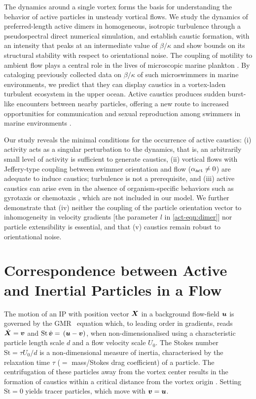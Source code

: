 \documentclass[../Rajarshi-thesis-draft.tex]{subfiles}
\begin{document}
The dynamics around a single vortex forms the basis for understanding the behavior of active particles in unsteady vortical flows. We study the dynamics of preferred-length active dimers in homogeneous, isotropic turbulence through a pseudospectral direct numerical simulation, and establish caustic formation, with an intensity that peaks at an intermediate value of $\beta/\kappa$ and show bounds on its structural stability with respect to orientational noise. The coupling of motility to ambient flow plays a central role in the lives of microscopic marine plankton \cite{Tuval2020, Krishnamurthy2020, mousavi2023efficient}. By cataloging previously collected data on $\beta/\kappa$ of such microswimmers in marine environments, we predict that they can display caustics in a vortex-laden turbulent ecosystem in the upper ocean. Active caustics produces sudden burst-like encounters between nearby particles, offering a new route to increased opportunities for communication and sexual reproduction \cite{BUSKEY199813} among swimmers in marine environments \cite{Tuval2020, StockerARFM2012}. 

Our study reveals the minimal conditions for the occurrence of active caustics: (i) activity acts as a singular perturbation to the dynamics, that is, an arbitrarily small level of activity is sufficient to generate caustics, (ii) vortical flows with Jeffery-type coupling between swimmer orientation and flow ($\alpha_{\rm act} \neq 0$) are adequate to induce caustics; turbulence is not a prerequisite, and (iii) active caustics can arise even in the absence of organism-specific behaviors such as gyrotaxis or chemotaxis \cite{Pedley1992}, which are not included in our model. We further demonstrate that (iv) neither the coupling of the particle orientation vector to inhomogeneity in velocity gradients [the parameter $l$ in \eqref{act-eqn:dimer}] nor particle extensibility is essential, and that (v) caustics remain robust to orientational noise.

\section{Correspondence between Active and Inertial Particles in a Flow}
The motion of an IP with position vector $\boldsymbol{X}$ in a background flow-field $\boldsymbol{u}$ is governed by the GMR~\cite{gatignol1983,MR1983} equation which, to leading order in gradients, reads $\dot{\boldsymbol{X}} = \boldsymbol{v}$ and $\text{St} \, \dot{\boldsymbol{v}}=  \, (\boldsymbol{u}-\boldsymbol{v})$, when non-dimensionalised using a characteristic particle length scale $d$ and a flow velocity scale $U_0$. The Stokes number $\text{St} = \tau U_0/d$ is a non-dimensional measure of inertia, characterised by the relaxation time $\tau$ ($=$ mass/Stokes drag coefficient) of a particle. The centrifugation of these particles away from the vortex center results in the formation of caustics within a critical distance from the vortex origin \cite{Croor2015}. Setting  $\text{St}=0$ yields tracer particles, which move with $\boldsymbol{v}=\boldsymbol{u}$.
\end{document}
